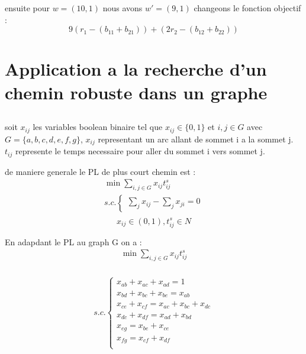 \documentclass[16pt, a4paper]{article}
\begin{document}
\begin{flushleft}
\begin{justify}
ensuite pour $w = (10 ,1)$ nous avons $w' = (9,1)$ changeons le fonction objectif : 
$$ 9(r_1-(b_{11}+b_{21}))+(2r_2-(b_{12}+b_{22}))$$
    





\pagebreak
\section{Application a la recherche d’un chemin robuste dans un graphe}
\subsection{}




soit $x_{ij}$ les variables boolean binaire tel que  $x_{ij}\in \{0 ,1\}$ et $i, j \in G$ avec $G = \{a,b,c,d,e,f,g\}$, $x_{ij}$ representant un arc allant de sommet i a la sommet j. $t_{ij}$ represente le temps necessaire pour aller du sommet i vers sommet j.

de maniere generale le PL de plus court chemin est : 
\begin{align*}
    \min \sum_{i,j \in G} x_{ij}t_{ij}^s \\
    s.c.\begin{cases}
            \sum_j x_{ij} - \sum_j x_{ji} = 0 
        \end{cases}\\
\end{align*}
$$x_{ij} \in (0,1), t_{ij}^s \in N$$ 

En adapdant le PL au graph G  on a  :
\begin{align*}
    \min \sum_{i,j \in G} x_{ij}t_{ij}^s \\
\end{align*}

\begin{align*}
        s.c.\begin{cases}
            x_{ab} + x_{ac} + x_{ad} = 1\\
            x_{bd} + x_{bc} + x_{be} = x_{ab}\\
            x_{ce} + x_{cf} = x_{ac} + x_{bc} + x_{dc}\\
            x_{dc} + x_{df} = x_{ad} + x_{bd}\\
            x_{eg} = x_{be} + x_{ce}\\
            x_{fg} = x_{cf} + x_{df}\\
        \end{cases}\\
\end{align*}


\end{justify}
\end{flushleft}
\end{document}
